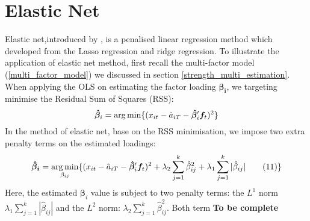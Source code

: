 	\section{Elastic Net}\label{Elastic_Net}

Elastic net,introduced by ,  is a penalised linear regression method which developed from the Lasso regression \cite{Tibshirani1996} and ridge regression.
To illustrate the application of elastic net method, first recall the multi-factor model (\ref{multi_factor_model}) we discussed in section \ref{strength_multi_estimation}.
When applying the OLS on estimating the factor loading $\bm{\beta_{i}}$, we targeting minimise the Residual Sum of Squares (RSS):
\[  \bm{\hat{\beta}}_i =   \operatorname*{arg\,min}\{  (x_{it} - \hat{a}_{iT} - \bm{\hat{\beta}}_i^{\prime}\bm{f}_t )^2 \}    \]
In the method of elastic net, base on the RSS minimisation, we impose two extra penalty terms on the estimated loadings:
	\[   \bm{\hat{\beta}_{i}}  = \operatorname*{arg\,min}_{\beta_{ij}}\{ (x_{it} - \hat{a}_{iT} - \bm{\hat{\beta}}_{i} ^{\prime}\bm{f}_{t})^2 + \lambda_2\sum_{j = 1}^k\hat{\beta}_{ij}^2  + \lambda_1\sum_{j=1}^k|\hat{\beta}_{ij}|  \label{ENcriterion} \tag{11}   \}    \]
Here, the estimated $\bm{\beta}_i$ value is subject to two penalty terms: the $L^1$ norm $\lambda_1\sum_{j=1}^k|\hat{\beta}_{ij}|$ and the $L^2$ norm: $\lambda_2\sum_{j = 1}^k\hat{\beta}_{ij}^2$.
Both term 
{\bf To be complete}